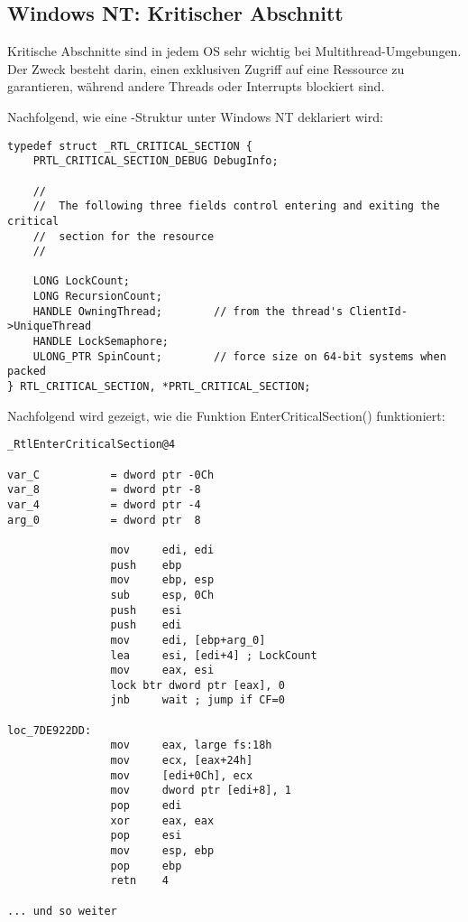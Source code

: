 \subsection{Windows NT: Kritischer Abschnitt}

\label{critical_sections}

Kritische Abschnitte sind in jedem \ac{OS} sehr wichtig bei Multithread-Umgebungen.
Der Zweck besteht darin, einen exklusiven Zugriff auf eine Ressource zu garantieren,
während andere Threads oder Interrupts blockiert sind.

\par
Nachfolgend, wie eine -Struktur unter \gls{Windows NT} deklariert wird:

\begin{lstlisting}[caption=(Windows Research Kernel v1.2) public/sdk/inc/nturtl.h,style=customc]
typedef struct _RTL_CRITICAL_SECTION {
    PRTL_CRITICAL_SECTION_DEBUG DebugInfo;

    //
    //  The following three fields control entering and exiting the critical
    //  section for the resource
    //

    LONG LockCount;
    LONG RecursionCount;
    HANDLE OwningThread;        // from the thread's ClientId->UniqueThread
    HANDLE LockSemaphore;
    ULONG_PTR SpinCount;        // force size on 64-bit systems when packed
} RTL_CRITICAL_SECTION, *PRTL_CRITICAL_SECTION;
\end{lstlisting}

Nachfolgend wird gezeigt, wie die Funktion EnterCriticalSection() funktioniert:

\begin{lstlisting}[caption=Windows 2008/ntdll.dll/x86 (begin),style=customasmx86]
_RtlEnterCriticalSection@4

var_C           = dword ptr -0Ch
var_8           = dword ptr -8
var_4           = dword ptr -4
arg_0           = dword ptr  8

                mov     edi, edi
                push    ebp
                mov     ebp, esp
                sub     esp, 0Ch
                push    esi
                push    edi
                mov     edi, [ebp+arg_0]
                lea     esi, [edi+4] ; LockCount
                mov     eax, esi
                lock btr dword ptr [eax], 0
                jnb     wait ; jump if CF=0

loc_7DE922DD:
                mov     eax, large fs:18h
                mov     ecx, [eax+24h]
                mov     [edi+0Ch], ecx
                mov     dword ptr [edi+8], 1
                pop     edi
                xor     eax, eax
                pop     esi
                mov     esp, ebp
                pop     ebp
                retn    4

... und so weiter
\end{lstlisting}

